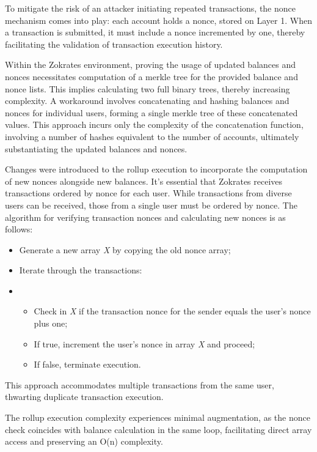 To mitigate the risk of an attacker initiating repeated transactions, the nonce mechanism comes into play: each account holds a nonce, stored on Layer 1. When a transaction is submitted, it must include a nonce incremented by one, thereby facilitating the validation of transaction execution history.

Within the Zokrates environment, proving the usage of updated balances and nonces necessitates computation of a merkle tree for the provided balance and nonce lists. This implies calculating two full binary trees, thereby increasing complexity. A workaround involves concatenating and hashing balances and nonces for individual users, forming a single merkle tree of these concatenated values. This approach incurs only the complexity of the concatenation function, involving a number of hashes equivalent to the number of accounts, ultimately substantiating the updated balances and nonces.

Changes were introduced to the rollup execution to incorporate the computation of new nonces alongside new balances. It's essential that Zokrates receives transactions ordered by nonce for each user. While transactions from diverse users can be received, those from a single user must be ordered by nonce. The algorithm for verifying transaction nonces and calculating new nonces is as follows:
\begin{itemize}
	\item Generate a new array \textit{X} by copying the old nonce array;
	\item Iterate through the transactions:
	\item \begin{itemize}
		\item Check in \textit{X} if the transaction nonce for the sender equals the user's nonce plus one;
		\item If true, increment the user's nonce in array \textit{X} and proceed;
		\item If false, terminate execution.
    \end{itemize}
\end{itemize}

This approach accommodates multiple transactions from the same user, thwarting duplicate transaction execution.

The rollup execution complexity experiences minimal augmentation, as the nonce check coincides with balance calculation in the same loop, facilitating direct array access and preserving an O(n) complexity.

